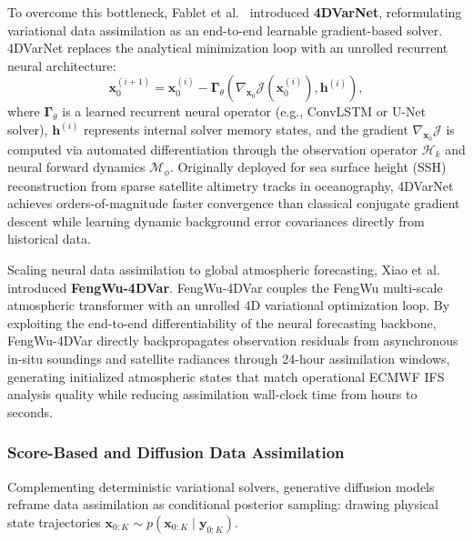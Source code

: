 To overcome this bottleneck, Fablet et al.~\cite{fablet2021learning} introduced \textbf{4DVarNet}, reformulating variational data assimilation as an end-to-end learnable gradient-based solver. 4DVarNet replaces the analytical minimization loop with an unrolled recurrent neural architecture:
\begin{equation}
    \mathbf{x}_0^{(i+1)} = \mathbf{x}_0^{(i)} - \boldsymbol{\Gamma}_\theta \left( \nabla_{\mathbf{x}_0} \mathcal{J}(\mathbf{x}_0^{(i)}), \mathbf{h}^{(i)} \right),
    \label{eq:neural_4dvar_step}
\end{equation}
where $\boldsymbol{\Gamma}_\theta$ is a learned recurrent neural operator (e.g., ConvLSTM or U-Net solver), $\mathbf{h}^{(i)}$ represents internal solver memory states, and the gradient $\nabla_{\mathbf{x}_0} \mathcal{J}$ is computed via automated differentiation through the observation operator $\mathcal{H}_k$ and neural forward dynamics $\mathcal{M}_\phi$. Originally deployed for sea surface height (SSH) reconstruction from sparse satellite altimetry tracks in oceanography, 4DVarNet achieves orders-of-magnitude faster convergence than classical conjugate gradient descent while learning dynamic background error covariances directly from historical data.

Scaling neural data assimilation to global atmospheric forecasting, Xiao et al.~\cite{xiao2023fengwu4dvar} introduced \textbf{FengWu-4DVar}. FengWu-4DVar couples the FengWu multi-scale atmospheric transformer with an unrolled 4D variational optimization loop. By exploiting the end-to-end differentiability of the neural forecasting backbone, FengWu-4DVar directly backpropagates observation residuals from asynchronous in-situ soundings and satellite radiances through 24-hour assimilation windows, generating initialized atmospheric states that match operational ECMWF IFS analysis quality while reducing assimilation wall-clock time from hours to seconds.

\subsubsection{Score-Based and Diffusion Data Assimilation}
Complementing deterministic variational solvers, generative diffusion models reframe data assimilation as conditional posterior sampling: drawing physical state trajectories $\mathbf{x}_{0:K} \sim p(\mathbf{x}_{0:K} \mid \mathbf{y}_{0:K})$.

